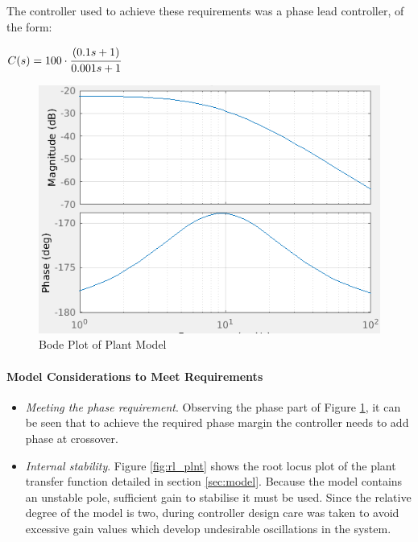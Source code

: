 \documentclass[11pt, a4paper,twocolumn]{article}
\begin{document}
	The controller used to achieve these requirements was a phase lead controller, of the form:
	\begin{center}
		$ C(s) = 100 \cdot \cfrac{(0.1s + 1)}{0.001s + 1} $
	\end{center}
		\begin{figure}[h!]
			\centering
			\includegraphics[scale=0.4]{bode_plant}
			\caption{Bode Plot of Plant Model}
			\label{fig:bode_plnt}
		\end{figure}
	\paragraph{		Model Considerations to Meet Requirements }
		
	\begin{itemize}
		\item \textit{Meeting the phase requirement}. Observing the phase part of Figure \ref{fig:bode_plnt}, it can be seen that to achieve the required phase margin the controller needs to add phase at crossover.
		\item \textit{Internal stability}. Figure \ref{fig:rl_plnt} shows the root locus plot of the plant transfer function detailed in section \ref{sec:model}. Because the model contains an unstable pole, sufficient gain to stabilise it must be used. Since the relative degree of the model is two, during controller design care was taken to avoid excessive gain values which develop undesirable oscillations in the system.
	\end{itemize}				
		
\end{document}
